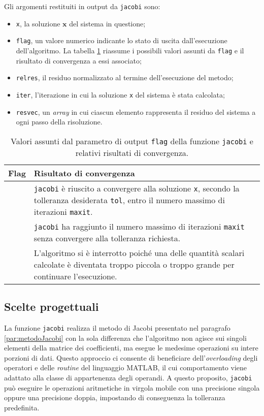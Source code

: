Gli argomenti restituiti in output da \lstinline|jacobi| sono:
\begin{itemize}
    \item \lstinline|x|, la soluzione $\mathbf{x}$ del sistema in questione;
    \item \lstinline|flag|, un valore numerico indicante lo stato di uscita dall'esecuzione dell'algoritmo. La tabella \ref{tab:flagJacobi} riassume i possibili valori assunti da \lstinline|flag| e il risultato di convergenza a essi associato;
     \item \lstinline|relres|, il residuo normalizzato al termine dell'esecuzione del metodo;
    \item \lstinline|iter|, l'iterazione in cui la soluzione \lstinline|x| del sistema \`e stata calcolata;
    \item \lstinline|resvec|, un \textit{array} in cui ciascun elemento rappresenta il residuo del sistema a ogni passo della risoluzione.
\end{itemize}
\begin{table}[htbp]
    \renewcommand{\arraystretch}{1.2}
    \centering
    \begin{tabularx}{\textwidth}{@{} >{\centering\arraybackslash}m{1.5cm} X @{}}
        \toprule
        Flag & Risultato di convergenza \\
        \midrule
        0 & \lstinline{jacobi} è riuscito a convergere alla soluzione \lstinline{x}, secondo la tolleranza desiderata \lstinline{tol}, entro il numero massimo di iterazioni \lstinline{maxit}. \\
        \addlinespace
        1 & \lstinline{jacobi} ha raggiunto il numero massimo di iterazioni \lstinline{maxit} senza convergere alla tolleranza richiesta. \\
        \addlinespace
        2 & L'algoritmo si è interrotto poiché una delle quantità scalari calcolate è diventata troppo piccola o troppo grande per continuare l'esecuzione. \\
        \bottomrule
    \end{tabularx}
    \caption{Valori assunti dal parametro di output \lstinline{flag} della funzione \lstinline{jacobi} e relativi risultati di convergenza.}
    \label{tab:flagJacobi}
\end{table}
\subsection{Scelte progettuali}
La funzione \lstinline{jacobi} realizza il metodo di Jacobi presentato nel paragrafo \ref{par:metodoJacobi} con la sola differenza che l'algoritmo non agisce sui 
singoli elementi della matrice dei coefficienti, ma esegue le medesime operazioni su intere porzioni di dati.\newline
Questo approccio ci consente di beneficiare dell'\textit{overloading} degli operatori e delle \textit{routine} del linguaggio MATLAB, il cui comportamento viene adattato
alla classe di appartenenza degli operandi.\newline
A questo proposito, \lstinline{jacobi} pu\`o eseguire le operazioni aritmetiche in virgola mobile con una precisione singola oppure una precisione 
doppia, impostando di conseguenza la tolleranza predefinita.


